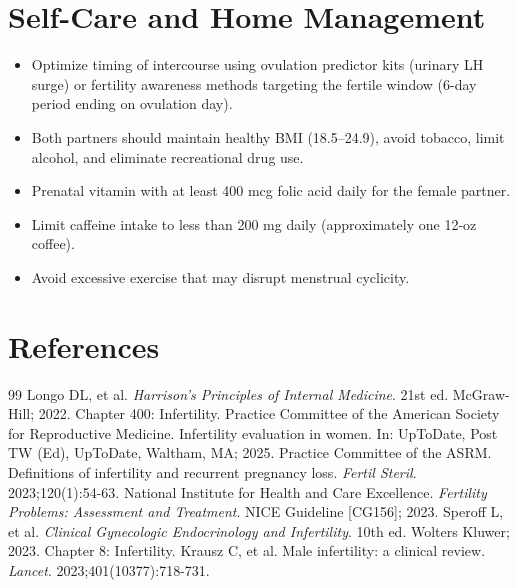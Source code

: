 \section*{Self-Care and Home Management}
\begin{itemize}
  \item Optimize timing of intercourse using ovulation predictor kits (urinary LH surge) or fertility awareness methods targeting the fertile window (6-day period ending on ovulation day).
  \item Both partners should maintain healthy BMI (18.5--24.9), avoid tobacco, limit alcohol, and eliminate recreational drug use.
  \item Prenatal vitamin with at least 400 mcg folic acid daily for the female partner.
  \item Limit caffeine intake to less than 200 mg daily (approximately one 12-oz coffee).
  \item Avoid excessive exercise that may disrupt menstrual cyclicity.
\end{itemize}

\section*{References}

\begin{thebibliography}{99}
 Longo DL, et al. \emph{Harrison's Principles of Internal Medicine}. 21st ed. McGraw-Hill; 2022. Chapter 400: Infertility.
 Practice Committee of the American Society for Reproductive Medicine. Infertility evaluation in women. In: UpToDate, Post TW (Ed), UpToDate, Waltham, MA; 2025.
 Practice Committee of the ASRM. Definitions of infertility and recurrent pregnancy loss. \emph{Fertil Steril}. 2023;120(1):54-63.
 National Institute for Health and Care Excellence. \emph{Fertility Problems: Assessment and Treatment}. NICE Guideline [CG156]; 2023.
 Speroff L, et al. \emph{Clinical Gynecologic Endocrinology and Infertility}. 10th ed. Wolters Kluwer; 2023. Chapter 8: Infertility.
 Krausz C, et al. Male infertility: a clinical review. \emph{Lancet}. 2023;401(10377):718-731.
\end{thebibliography}
